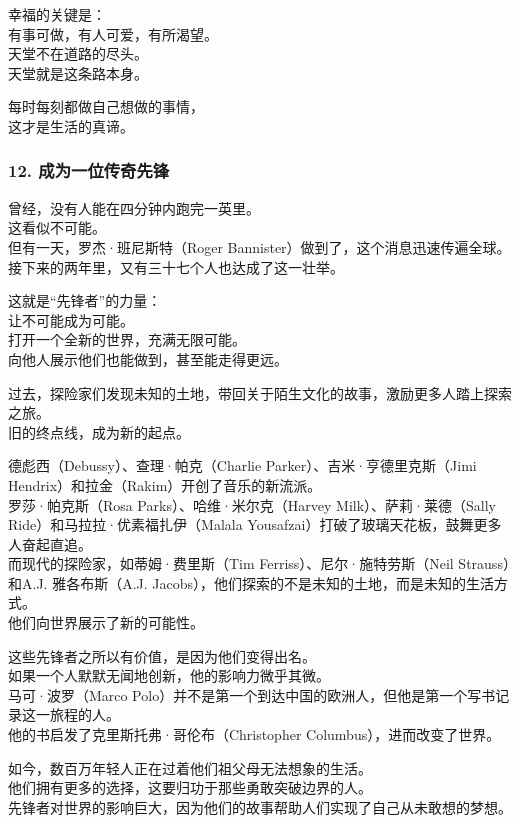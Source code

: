 \documentclass[
]{article}
\begin{document}
幸福的关键是：\\
有事可做，有人可爱，有所渴望。\\
天堂不在道路的尽头。\\
天堂就是这条路本身。

每时每刻都做自己想做的事情，\\
这才是生活的真谛。

\subsubsection{\texorpdfstring{12. 成为一位传奇先锋
}{12. 成为一位传奇先锋 }}\label{12-ux6210ux4e3aux4e00ux4f4dux4f20ux5947ux5148ux950b}

曾经，没有人能在四分钟内跑完一英里。\\
这看似不可能。\\
但有一天，罗杰·班尼斯特（Roger
Bannister）做到了，这个消息迅速传遍全球。\\
接下来的两年里，又有三十七个人也达成了这一壮举。

这就是``先锋者''的力量：\\
让不可能成为可能。\\
打开一个全新的世界，充满无限可能。\\
向他人展示他们也能做到，甚至能走得更远。

过去，探险家们发现未知的土地，带回关于陌生文化的故事，激励更多人踏上探索之旅。\\
旧的终点线，成为新的起点。

德彪西（Debussy）、查理·帕克（Charlie Parker）、吉米·亨德里克斯（Jimi
Hendrix）和拉金（Rakim）开创了音乐的新流派。\\
罗莎·帕克斯（Rosa Parks）、哈维·米尔克（Harvey Milk）、萨莉·莱德（Sally
Ride）和马拉拉·优素福扎伊（Malala
Yousafzai）打破了玻璃天花板，鼓舞更多人奋起直追。\\
而现代的探险家，如蒂姆·费里斯（Tim Ferriss）、尼尔·施特劳斯（Neil
Strauss）和A.J. 雅各布斯（A.J.
Jacobs），他们探索的不是未知的土地，而是未知的生活方式。\\
他们向世界展示了新的可能性。

这些先锋者之所以有价值，是因为他们变得出名。\\
如果一个人默默无闻地创新，他的影响力微乎其微。\\
马可·波罗（Marco
Polo）并不是第一个到达中国的欧洲人，但他是第一个写书记录这一旅程的人。\\
他的书启发了克里斯托弗·哥伦布（Christopher Columbus），进而改变了世界。

如今，数百万年轻人正在过着他们祖父母无法想象的生活。\\
他们拥有更多的选择，这要归功于那些勇敢突破边界的人。\\
先锋者对世界的影响巨大，因为他们的故事帮助人们实现了自己从未敢想的梦想。
\end{document}
